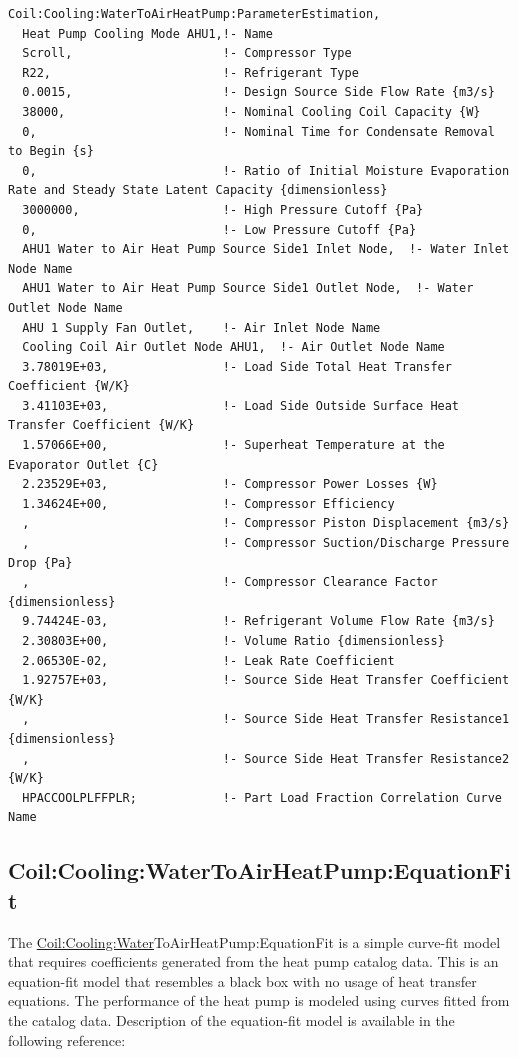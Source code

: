 \begin{lstlisting}
Coil:Cooling:WaterToAirHeatPump:ParameterEstimation,
  Heat Pump Cooling Mode AHU1,!- Name
  Scroll,                     !- Compressor Type
  R22,                        !- Refrigerant Type
  0.0015,                     !- Design Source Side Flow Rate {m3/s}
  38000,                      !- Nominal Cooling Coil Capacity {W}
  0,                          !- Nominal Time for Condensate Removal to Begin {s}
  0,                          !- Ratio of Initial Moisture Evaporation Rate and Steady State Latent Capacity {dimensionless}
  3000000,                    !- High Pressure Cutoff {Pa}
  0,                          !- Low Pressure Cutoff {Pa}
  AHU1 Water to Air Heat Pump Source Side1 Inlet Node,  !- Water Inlet Node Name
  AHU1 Water to Air Heat Pump Source Side1 Outlet Node,  !- Water Outlet Node Name
  AHU 1 Supply Fan Outlet,    !- Air Inlet Node Name
  Cooling Coil Air Outlet Node AHU1,  !- Air Outlet Node Name
  3.78019E+03,                !- Load Side Total Heat Transfer Coefficient {W/K}
  3.41103E+03,                !- Load Side Outside Surface Heat Transfer Coefficient {W/K}
  1.57066E+00,                !- Superheat Temperature at the Evaporator Outlet {C}
  2.23529E+03,                !- Compressor Power Losses {W}
  1.34624E+00,                !- Compressor Efficiency
  ,                           !- Compressor Piston Displacement {m3/s}
  ,                           !- Compressor Suction/Discharge Pressure Drop {Pa}
  ,                           !- Compressor Clearance Factor {dimensionless}
  9.74424E-03,                !- Refrigerant Volume Flow Rate {m3/s}
  2.30803E+00,                !- Volume Ratio {dimensionless}
  2.06530E-02,                !- Leak Rate Coefficient
  1.92757E+03,                !- Source Side Heat Transfer Coefficient {W/K}
  ,                           !- Source Side Heat Transfer Resistance1 {dimensionless}
  ,                           !- Source Side Heat Transfer Resistance2 {W/K}
  HPACCOOLPLFFPLR;            !- Part Load Fraction Correlation Curve Name
\end{lstlisting}

\subsection{Coil:Cooling:WaterToAirHeatPump:EquationFit}\label{coilcoolingwatertoairheatpumpequationfit}

The \hyperref[coilcoolingwater]{Coil:Cooling:Water}ToAirHeatPump:EquationFit is a simple curve-fit model that requires coefficients generated from the heat pump catalog data. This is an equation-fit model that resembles a black box with no usage of heat transfer equations. The performance of the heat pump is modeled using curves fitted from the catalog data. Description of the equation-fit model is available in the following reference:

